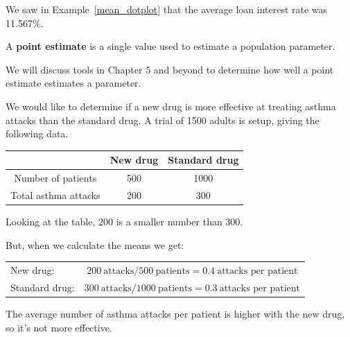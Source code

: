 \documentclass[handout]{beamer}
\begin{document}
\begin{frame}
\begin{example}
We saw in Example~\ref{mean_dotplot} that the average loan interest rate was 11.567\%.

\vspace{1mm}
\pause
{}\pause

\vspace{2mm}
\pause
{}
\end{example}\pause

\begin{definition}
A \textbf{point estimate} is a single value used to estimate a population parameter.
\end{definition}\pause

\begin{note}
We will discuss tools in Chapter 5 and beyond to determine how well a point estimate estimates a parameter.
\end{note}
\end{frame}

\begin{frame}
\begin{example}
We would like to determine if a new drug is more effective at treating asthma attacks than the standard drug. A trial of 1500 adults is setup, giving the following data.

\vspace{-5mm}
\begin{center}
\begin{tabular}{c|cc}
& New drug & Standard drug \\\hline
Number of patients & 500 & 1000 \\
Total asthma attacks & 200 & 300
\end{tabular}
\end{center}
\pause
{}\pause
 
 \vspace{1mm}
Looking at the table, 200 is a smaller number than 300. \pause

\vspace{1mm}
But, when we calculate the means we get:

\vspace{-4mm}
\begin{center}
\begin{tabular}{lc}
New drug: & $200~\text{attacks} / 500~\text{patients}=0.4~\text{attacks per patient}$ \\[2mm]
Standard drug: & $300~\text{attacks} / 1000~\text{patients}=0.3~\text{attacks per patient}$
\end{tabular}
\end{center}\pause
The average number of asthma attacks per patient is higher with the new drug, so it's not more effective.
\end{example}
\end{frame}
\end{document}
